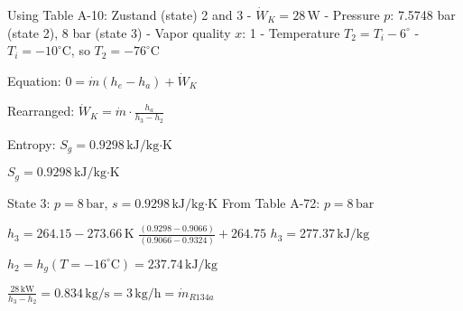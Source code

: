 Using Table A-10: Zustand (state) 2 and 3  
- \( \dot{W}_K = 28 \, \text{W} \)  
- Pressure \( p \): 7.5748 bar (state 2), 8 bar (state 3)  
- Vapor quality \( x \): 1  
- Temperature \( T_2 = T_i - 6^\circ \)  
- \( T_i = -10^\circ \text{C} \), so \( T_2 = -76^\circ \text{C} \)  

Equation:  
\( 0 = \dot{m} (h_e - h_a) + \dot{W}_K \)  

Rearranged:  
\( \dot{W}_K = \dot{m} \cdot \frac{h_a}{h_3 - h_2} \)  

Entropy:  
\( S_g = 0.9298 \, \text{kJ/kg·K} \)  

\( S_g = 0.9298 \, \text{kJ/kg·K} \)

State 3: \( p = 8 \, \text{bar} \), \( s = 0.9298 \, \text{kJ/kg·K} \)  
From Table A-72: \( p = 8 \, \text{bar} \)  

\( h_3 = 264.15 - 273.66 \, \text{K} \)  
\( \frac{(0.9298 - 0.9066)}{(0.9066 - 0.9324)} + 264.75 \)  
\( h_3 = 277.37 \, \text{kJ/kg} \)  

\( h_2 = h_g(T = -16^\circ \text{C}) = 237.74 \, \text{kJ/kg} \)  

\( \frac{28 \, \text{kW}}{h_3 - h_2} = 0.834 \, \text{kg/s} = 3 \, \text{kg/h} = \dot{m}_{R134a} \)